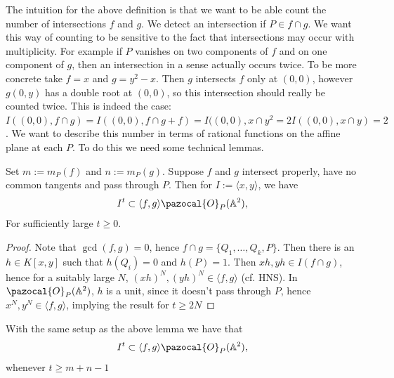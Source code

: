    The intuition for the above definition is that we want to be able count the number of intersections $f$ and $g$. We detect an intersection if $P\in f\cap g$. We want this way of counting to be sensitive to the fact that intersections may occur with multiplicity. For example if $P$ vanishes on two components of $f$ and on one component of $g$, then an intersection in a sense actually occurs twice. To be more concrete take $f=x$ and $g=y^2-x$. Then $g$ intersects $f$ only at $(0,0)$, however $g(0,y)$ has a double root at $(0,0)$, so this intersection should really be counted twice. This is indeed the case: $I((0,0), f\cap g)=I((0,0), f\cap g+f)=I((0,0), x\cap y^2=2I((0,0), x\cap y)=2$. We want to describe this number in terms of rational functions on the affine plane at each $P$. To do this we need some technical lemmas.
    \begin{lemma}\label{RadicalOfXYIdeal}
        Set $m:= m_P(f)$ and $n:=m_P(g)$. Suppose $f$ and $g$ intersect properly, have no common tangents and pass through $P$. Then for $I:=\langle x,y\rangle$, we have
        $$I^t \subset \langle f,g\rangle \pazocal{O}_P(\A^2),$$
        For sufficiently large $t\geq 0$. 
    \end{lemma}
    \begin{proof}
        Note that $\gcd(f,g)=0$, hence $f\cap g = \{Q_1,\dots,Q_k,P\}$. Then there is an $h\in K[x,y]$ such that $h(Q_i)=0$ and $h(P)=1$. Then $xh,yh\in I(f\cap g)$, hence for a suitably large $N$, $(xh)^N,(yh)^N\in \langle f,g\rangle$ (cf. HNS). In $\pazocal{O}_P(\A^2)$, $h$ is a unit, since it doesn't pass through $P$, hence $x^N,y^N\in \langle f,g\rangle$, implying the result for $t\geq 2N$ 
    \end{proof}
    \begin{lemma}\label{TechnicalIntersectionNumberLemma1}
        With the same setup as the above lemma we have that 
        $$I^t \subset \langle f,g\rangle \pazocal{O}_P(\A^2),$$
        whenever $t\geq m+n-1$
    \end{lemma}
